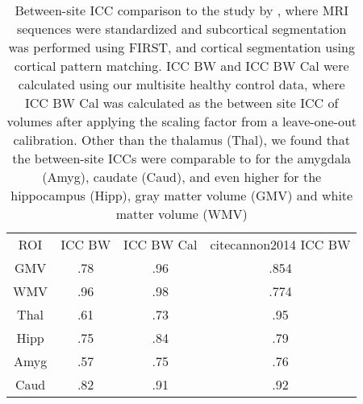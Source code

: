 \begin{table} 
    \begin{tabular}{ c c c c }
        ROI & ICC BW & ICC BW Cal & cite{cannon2014} ICC BW \\ 
        GMV & .78 & .96 & .854 \\ 
        WMV & .96 & .98 & .774 \\ 
        Thal & .61 & .73 & .95 \\ 
        Hipp & .75 & .84 & .79 \\ 
        Amyg & .57 & .75 & .76 \\ 
        Caud & .82 & .91 & .92 \\ 
    \end{tabular} 
    \caption{Between-site ICC comparison to the study by \cite{cannon2014}, where MRI sequences were standardized and subcortical segmentation was performed using FIRST, and cortical segmentation using cortical pattern matching. ICC BW and ICC BW Cal were calculated using our multisite healthy control data, where ICC BW Cal was calculated as the between site ICC of volumes after applying the scaling factor from a leave-one-out calibration. Other than the thalamus (Thal), we found that the between-site ICCs were comparable to \cite{cannon2014} for the amygdala (Amyg), caudate (Caud), and even higher for the hippocampus (Hipp), gray matter volume (GMV) and white matter volume (WMV)} 
\label{comparetocannon}
\end{table}
